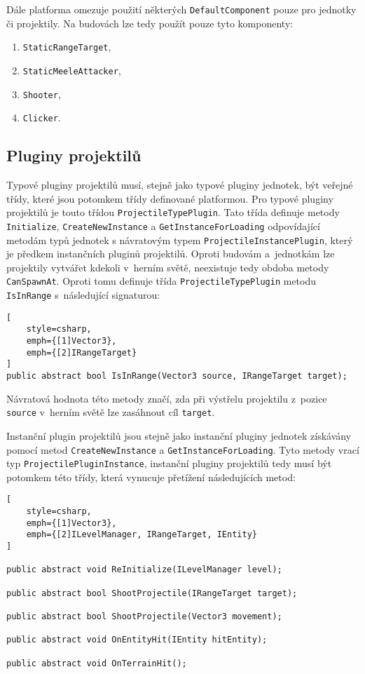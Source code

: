 Dále platforma omezuje použití některých \texttt{DefaultComponent} pouze pro jednotky či projektily. Na budovách lze tedy použít pouze tyto komponenty:
\begin{enumerate}
	\item \texttt{StaticRangeTarget},
	\item \texttt{StaticMeeleAttacker},
	\item \texttt{Shooter},
	\item \texttt{Clicker}.
\end{enumerate}

\subsection{Pluginy projektilů}
Typové pluginy projektilů musí, stejně jako typové pluginy jednotek, být veřejné třídy, které jsou potomkem třídy definované platformou. Pro typové pluginy projektilů je touto třídou \texttt{ProjectileTypePlugin}. Tato třída definuje metody \texttt{Initialize}, \texttt{CreateNewInstance} a \texttt{GetInstanceForLoading} odpovídající metodám typů jednotek s návratovým typem \texttt{ProjectileInstancePlugin}, který je předkem instančních pluginů projektilů. Oproti budovám a~jednotkám lze projektily vytvářet kdekoli v~herním světě, neexistuje tedy obdoba metody \texttt{CanSpawnAt}. Oproti tomu definuje třída  \texttt{ProjectileTypePlugin} metodu \texttt{IsInRange} s~následující signaturou:

\begin{lstlisting}[
	style=csharp,
	emph={[1]Vector3},
	emph={[2]IRangeTarget}
]
public abstract bool IsInRange(Vector3 source, IRangeTarget target);
\end{lstlisting}

Návratová hodnota této metody značí, zda při výstřelu projektilu z~pozice \texttt{source} v~herním světě lze zasáhnout cíl \texttt{target}.

Instanční plugin projektilů jsou stejně jako instanční pluginy jednotek získávány pomocí metod \texttt{CreateNewInstance} a \texttt{GetInstanceForLoading}. Tyto metody vrací typ \texttt{ProjectilePluginInstance}, instanční pluginy projektilů tedy musí být potomkem této třídy, která vynucuje přetížení následujících metod:
\begin{lstlisting}[
	style=csharp,
	emph={[1]Vector3},
	emph={[2]ILevelManager, IRangeTarget, IEntity}
]

public abstract void ReInitialize(ILevelManager level);

public abstract bool ShootProjectile(IRangeTarget target);

public abstract bool ShootProjectile(Vector3 movement);

public abstract void OnEntityHit(IEntity hitEntity);

public abstract void OnTerrainHit();
\end{lstlisting}


